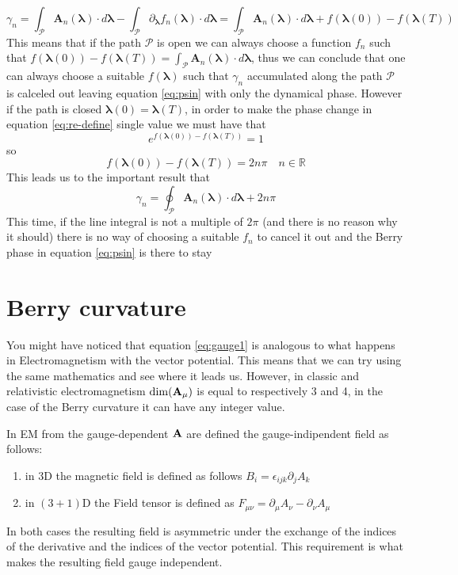     \[
        \gamma_n=\int_\mathcal{P} \mathbf A_n(\boldsymbol \lambda) \cdot d\boldsymbol \lambda - \int_\mathcal{P} \partial_{\boldsymbol \lambda}f_n(\boldsymbol \lambda) \cdot d\boldsymbol \lambda= \int_\mathcal{P} \mathbf A_n(\boldsymbol \lambda) \cdot d\boldsymbol \lambda + f(\boldsymbol \lambda(0))-f(\boldsymbol \lambda (T))
    \]
    This means that if the path $\mathcal{P}$ is open we can always choose a function $f_n$ such that 
    $f(\boldsymbol \lambda(0))-f(\boldsymbol \lambda(T))=\int_\mathcal{P} \mathbf A_n(\boldsymbol \lambda) \cdot d\boldsymbol \lambda$, 
    thus we can conclude that one can always choose a suitable $f(\boldsymbol \lambda)$ such that $\gamma_n$ accumulated along the path $\mathcal P$ is calceled out leaving equation 
    \ref{eq:psin} with only the dynamical phase. 
    However if the path is closed $\boldsymbol \lambda(0)=\boldsymbol \lambda(T)$, in order to make the phase change
    in equation \ref{eq:re-define} single value we must have that
    \[
    e^{f(\boldsymbol \lambda(0))-f(\boldsymbol \lambda(T))}=1
    \]
    so 
    \[
        f(\boldsymbol \lambda(0))-f(\boldsymbol \lambda(T))=2n\pi \quad n\in \mathbb{R}
    \]
    This leads us to the important result that
    \begin{equation}
        \label{eq:closed-berry}
        \gamma_n=\oint_{\mathcal P} \mathbf A_n(\boldsymbol \lambda)\cdot d\boldsymbol \lambda + 2n\pi
    \end{equation}
    This time, if the line integral is not a multiple of $2\pi$ (and there is no reason why it should) there is no way of choosing a suitable $f_n$ to
    cancel it out and the Berry phase in equation \ref{eq:psin} is there to stay



\section{Berry curvature}
    You might have noticed that equation \ref{eq:gauge1} is analogous to what happens in Electromagnetism with the vector potential. This means that we can try using the same mathematics and see where it leads us. However, in classic and relativistic electromagnetism $\dim(\mathbf{A}_\mu)$ is equal to respectively 3 and 4, in the case of the Berry curvature it can have any integer value.

    In EM from the gauge-dependent $\mathbf{A}$ are defined the gauge-indipendent field as follows:
    \begin{enumerate}
        \item in $3$D the magnetic field is defined as follows $B_i=\epsilon_{ijk} \partial_j A_k$
        \item in $(3+1)$D the Field tensor is defined as $F_{\mu\nu}=\partial_\mu A_\nu-\partial_\nu A_\mu$
    \end{enumerate}
    In both cases the resulting field is asymmetric under the exchange of the indices of the derivative and the indices of the vector potential. This requirement is what makes the resulting field gauge independent.
    
